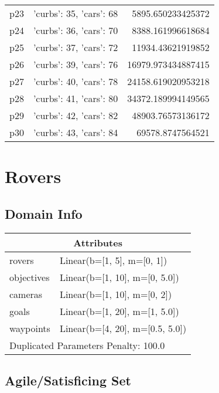 \documentclass{article}
\begin{document}
\begin{center}
\begin{tabular}{r|r|r}
  p23&{'curbs': 35, 'cars': 68}&5895.650233425372\\
  p24&{'curbs': 36, 'cars': 70}&8388.161996618684\\
  p25&{'curbs': 37, 'cars': 72}&11934.43621919852\\
  p26&{'curbs': 39, 'cars': 76}&16979.973434887415\\
  p27&{'curbs': 40, 'cars': 78}&24158.619020953218\\
  p28&{'curbs': 41, 'cars': 80}&34372.189994149565\\
  p29&{'curbs': 42, 'cars': 82}&48903.76573136172\\
  p30&{'curbs': 43, 'cars': 84}&69578.8747564521
                            \end{tabular}
                            \end{center}
                    
                            \newpage \section{Rovers}
                    \subsection*{Domain Info}

                    \begin{center}
                    \begin{tabular}{p{}p{}}
                    \multicolumn{2}{c}{\bf \large Attributes}\\\midrule
                    rovers & Linear(b=[1, 5], m=[0, 1])\\
objectives & Linear(b=[1, 10], m=[0, 5.0])\\
cameras & Linear(b=[1, 10], m=[0, 2])\\
goals & Linear(b=[1, 20], m=[1, 5.0])\\
waypoints & Linear(b=[4, 20], m=[0.5, 5.0])
                    
                     \\\midrule
                    \multicolumn{2}{l}{Duplicated Parameters Penalty: 100.0}
                    \end{tabular}
                    \end{center}
                
                         \subsection*{Agile/Satisficing Set}
\end{document}
